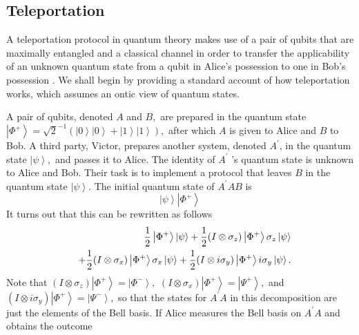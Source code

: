 \documentclass[pra,nofootinbib,showpacs,12pt]{revtex4}
\begin{document}
\subsection{Teleportation}

\label{teleportation}

A teleportation protocol in quantum theory makes use of a pair of qubits
that are maximally entangled and a classical channel in order to transfer
the applicability of an unknown quantum state from a qubit in Alice's
possession to one in Bob's possession \cite{teleportation}. We shall begin
by providing a standard account of how teleportation works, which assumes an
ontic view of quantum states.

A pair of qubits, denoted $A$ and $B,$ are prepared in the quantum state $%
\left| \Phi ^{+}\right\rangle =\sqrt{2}^{-1}\left( \left| 0\right\rangle
\left| 0\right\rangle +\left| 1\right\rangle \left| 1\right\rangle \right) ,$
after which $A$ is given to Alice and $B$ to Bob. A third party, Victor,
prepares another system, denoted $A^{\prime }$, in the quantum state $\left|
\psi \right\rangle ,$ and passes it to Alice. The identity of $A^{\prime }$%
's quantum state is unknown to Alice and Bob. Their task is to implement a
protocol that leaves $B$ in the quantum state $\left| \psi \right\rangle .$
The initial quantum state of $A^{\prime }AB$ is
\begin{equation}
\left| \psi \right\rangle \left| \Phi ^{+}\right\rangle
\end{equation}
It turns out that this can be rewritten as follows
\begin{eqnarray}
&&\frac{1}{2}\left| \Phi ^{+}\right\rangle \left| \psi \right\rangle +\frac{1%
}{2}(I\otimes \sigma _{z})\left| \Phi ^{+}\right\rangle \sigma _{z}\left|
\psi \right\rangle  \notag \\
&&+\frac{1}{2}(I\otimes \sigma _{x})\left| \Phi ^{+}\right\rangle \sigma
_{x}\left| \psi \right\rangle +\frac{1}{2}(I\otimes i\sigma _{y})\left| \Phi
^{+}\right\rangle i\sigma _{y}\left| \psi \right\rangle .  \notag \\
\end{eqnarray}
Note that $(I\otimes \sigma _{z})\left| \Phi ^{+}\right\rangle =\left| \Phi
^{-}\right\rangle ,$ $(I\otimes \sigma _{x})\left| \Phi ^{+}\right\rangle
=\left| \Psi ^{+}\right\rangle ,$ and $(I\otimes i\sigma _{y})\left| \Phi
^{+}\right\rangle =\left| \Psi ^{-}\right\rangle ,$ so that the states for $%
A^{\prime }A$ in this decomposition are just the elements of the Bell basis.
If Alice measures the Bell basis on $A^{\prime }A$ and obtains the outcome
\end{document}

